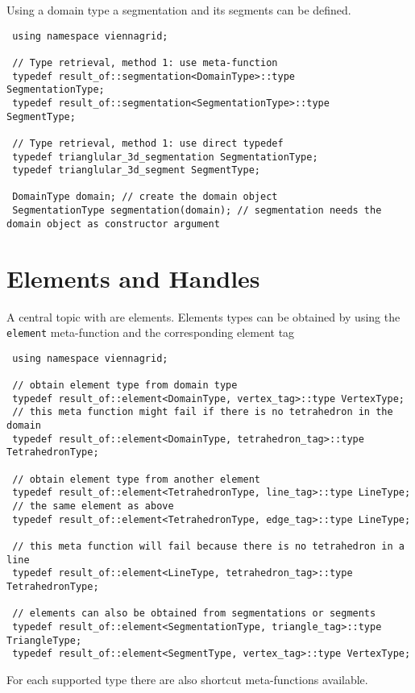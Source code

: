 Using a domain type a segmentation and its segments can be defined.

\begin{lstlisting}
 using namespace viennagrid;
 
 // Type retrieval, method 1: use meta-function
 typedef result_of::segmentation<DomainType>::type     SegmentationType;
 typedef result_of::segmentation<SegmentationType>::type     SegmentType;
 
 // Type retrieval, method 1: use direct typedef
 typedef trianglular_3d_segmentation SegmentationType;
 typedef trianglular_3d_segment SegmentType;

 DomainType domain; // create the domain object
 SegmentationType segmentation(domain); // segmentation needs the domain object as constructor argument
\end{lstlisting}

\section{Elements and Handles} \label{sec:elements-and-handles}

A central topic with {\ViennaGrid} are elements. Elements types can be obtained by using the \lstinline|element| meta-function and the corresponding element tag

\begin{lstlisting}
 using namespace viennagrid;
 
 // obtain element type from domain type
 typedef result_of::element<DomainType, vertex_tag>::type VertexType;
 // this meta function might fail if there is no tetrahedron in the domain
 typedef result_of::element<DomainType, tetrahedron_tag>::type TetrahedronType;
 
 // obtain element type from another element
 typedef result_of::element<TetrahedronType, line_tag>::type LineType;
 // the same element as above
 typedef result_of::element<TetrahedronType, edge_tag>::type LineType;
 
 // this meta function will fail because there is no tetrahedron in a line
 typedef result_of::element<LineType, tetrahedron_tag>::type TetrahedronType;
 
 // elements can also be obtained from segmentations or segments
 typedef result_of::element<SegmentationType, triangle_tag>::type TriangleType;
 typedef result_of::element<SegmentType, vertex_tag>::type VertexType;
\end{lstlisting}

For each supported type there are also shortcut meta-functions available.

